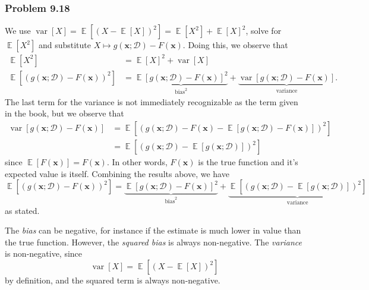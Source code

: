 \documentclass[12pt, a4paper]{article}
\newcommand{\D}{\mathcal{D}}
\newcommand{\vect}[1]{\bm{#1}}
\DeclareMathOperator{\E}{\mathbb{E}}
\DeclareMathOperator{\var}{\operatorname{var}}
\begin{document}
{\subsubsection*{Problem 9.18}
We use $\var\left[ X \right] = \E\left[ (X -  \E\left[X \right])^2 \right] = \E \left[X^2\right] + \E \left[X\right]^2$, solve for $\E \left[X^2\right]$ and substitute $X \mapsto g(\vect{x}; \D) -F (\vect{x})$.
Doing this, we observe that
\begin{align*}
	\E \left[X^2\right] 
	&= \E \left[X\right]^2 +  \var\left[ X \right] 
	\\
	\E \left[\left(  g(\vect{x}; \D) -F (\vect{x}) \right)^2\right] 
	&= 
	\underbrace{\E \left[g(\vect{x}; \D) - F (\vect{x}) \right]^2}_{\text{bias}^2} +  
	\underbrace{\var\left[ g(\vect{x}; \D) -F (\vect{x}) \right] }_{\text{variance}}.
\end{align*}
The last term for the variance is not immediately recognizable as the term given in the book, but we observe that
\begin{align*}
	\var\left[ g(\vect{x}; \D) -F (\vect{x}) \right]
	& =
	\E \left[ \left( g(\vect{x}; \D) -F (\vect{x}) - \E \left[ g(\vect{x}; \D) -F (\vect{x}) \right] \right)^2 \right] \\
	&= 
	\E \left[ \left( g(\vect{x}; \D)  - \E \left[ g(\vect{x}; \D) \right] \right)^2 \right]
\end{align*}
since $\E \left[ F (\vect{x}) \right] = F (\vect{x})$.
In other words,  $F (\vect{x})$ is the true function and it's expected value is itself.
Combining the results above, we have
\begin{equation*}
	\E \left[\left(  g(\vect{x}; \D) -F (\vect{x}) \right)^2\right] 
	= 
	\underbrace{\E \left[g(\vect{x}; \D) - F (\vect{x}) \right]^2}_{\text{bias}^2} +  
	\underbrace{\E \left[ \left( g(\vect{x}; \D)  - \E \left[ g(\vect{x}; \D) \right] \right)^2 \right]}_{\text{variance}}
\end{equation*}
as stated.

The \emph{bias} can be negative, for instance if the estimate is much lower in value than the true function. 
However, the \emph{squared bias} is always non-negative.
The \emph{variance} is non-negative, since
\begin{equation*}
	\var\left[ X \right] = \E\left[ (X -  \E\left[X \right])^2 \right]
\end{equation*}
by definition, and the squared term is always non-negative.




}
\end{document}
